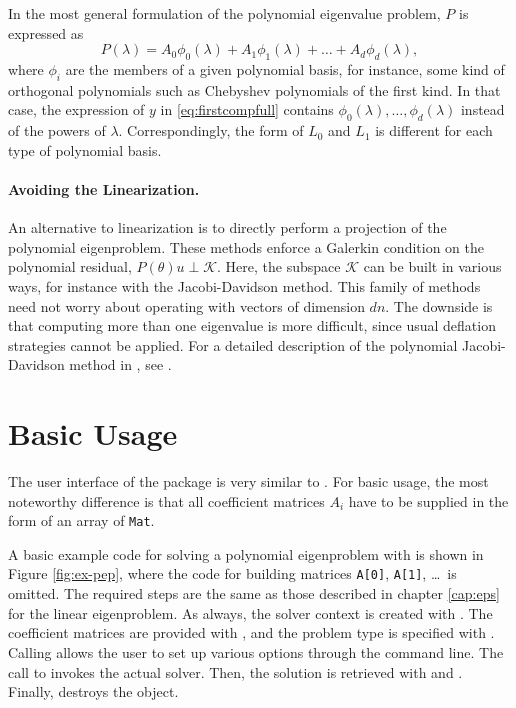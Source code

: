 In the most general formulation of the polynomial eigenvalue problem, $P$ is expressed as
\begin{equation}
\label{eq:pepnonmon}
P(\lambda)=A_0\phi_0(\lambda)+A_1\phi_1(\lambda)+\dots+A_d\phi_d(\lambda),
\end{equation}
where $\phi_i$ are the members of a given polynomial basis, for instance, some kind of orthogonal polynomials such as Chebyshev polynomials of the first kind. In that case, the expression of $y$ in \eqref{eq:firstcompfull} contains $\phi_0(\lambda),\dots,\phi_d(\lambda)$ instead of the powers of $\lambda$. Correspondingly, the form of $L_0$ and $L_1$ is different for each type of polynomial basis.

\paragraph{Avoiding the Linearization.}

An alternative to linearization is to directly perform a projection of the polynomial eigenproblem. These methods enforce a Galerkin condition on the polynomial residual, $P(\theta)u\perp \mathcal{K}$. Here, the subspace $\mathcal{K}$ can be built in various ways, for instance with the Jacobi-Davidson method. This family of methods need not worry about operating with vectors of dimension $dn$. The downside is that computing more than one eigenvalue is more difficult, since usual deflation strategies cannot be applied.
For a detailed description of the polynomial Jacobi-Davidson method in \slepc, see \citep{Campos:2020:PJS}.

\section{Basic Usage}

The user interface of the  package is very similar to . For basic usage, the most noteworthy difference is that all coefficient matrices $A_i$ have to be supplied in the form of an array of \texttt{Mat}.

A basic example code for solving a polynomial eigenproblem with  is shown in Figure \ref{fig:ex-pep}, where the code for building matrices \texttt{A[0]}, \texttt{A[1]}, \ldots\ is omitted. The required steps are the same as those described in chapter \ref{cap:eps} for the linear eigenproblem. As always, the solver context is created with . The coefficient matrices are provided with , and the problem type is specified with . Calling  allows the user to set up various options through the command line. The call to  invokes the actual solver. Then, the solution is retrieved with  and . Finally,  destroys the object.

